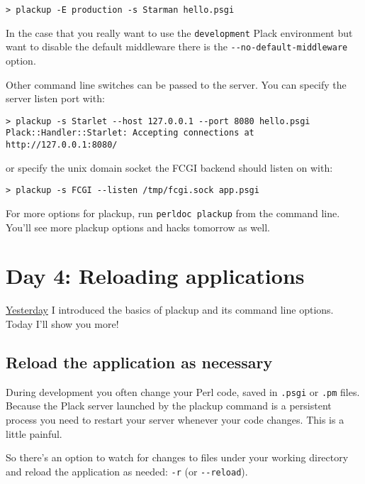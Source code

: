 \begin{lstlisting}
> plackup -E production -s Starman hello.psgi
\end{lstlisting}

In the case that you really want to use the \lstinline!development!
Plack environment but want to disable the default middleware there is
the \lstinline!--no-default-middleware! option.

Other command line switches can be passed to the server. You can specify
the server listen port with:

\begin{lstlisting}
> plackup -s Starlet --host 127.0.0.1 --port 8080 hello.psgi
Plack::Handler::Starlet: Accepting connections at http://127.0.0.1:8080/
\end{lstlisting}

or specify the unix domain socket the FCGI backend should listen on
with:

\begin{lstlisting}
> plackup -s FCGI --listen /tmp/fcgi.sock app.psgi
\end{lstlisting}

For more options for plackup, run \lstinline!perldoc plackup! from the
command line. You'll see more plackup options and hacks tomorrow as
well.

\section{Day 4: Reloading
applications}\label{day-4-reloading-applications}

\href{http://advent.plackperl.org/2009/12/day-3-using-plackup.html}{Yesterday}
I introduced the basics of plackup and its command line options. Today
I'll show you more!

\subsection{Reload the application as
necessary}\label{reload-the-application-as-necessary}

During development you often change your Perl code, saved in
\lstinline!.psgi! or \lstinline!.pm! files. Because the Plack server
launched by the plackup command is a persistent process you need to
restart your server whenever your code changes. This is a little
painful.

So there's an option to watch for changes to files under your working
directory and reload the application as needed: \lstinline!-r! (or
\lstinline!--reload!).

